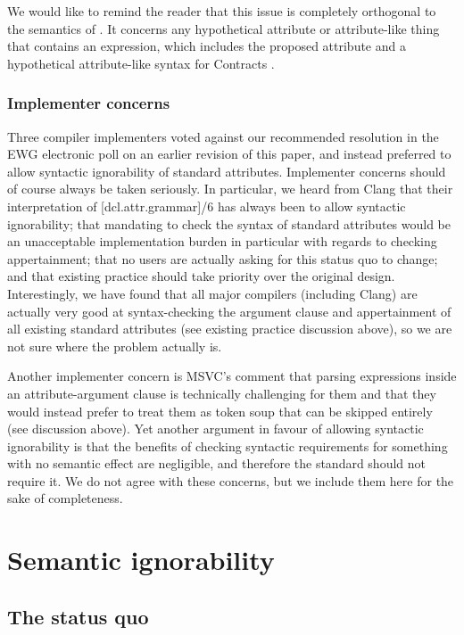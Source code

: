 We would like to remind the reader that this issue is completely orthogonal to the semantics of . It concerns any hypothetical attribute or attribute-like thing that contains an expression, which includes the proposed  attribute \cite{P1144R5} and a hypothetical attribute-like syntax for Contracts \cite{P2487R0}.

\subsubsection{Implementer concerns}
 
Three compiler implementers voted against our recommended resolution in the EWG electronic poll on an earlier revision of this paper, and instead preferred to allow syntactic ignorability of standard attributes. Implementer concerns should of course always be taken seriously. In particular, we heard from Clang that their interpretation of [dcl.attr.grammar]/6 has always been to allow syntactic ignorability; that mandating to check the syntax of standard attributes would be an unacceptable implementation burden in particular with regards to checking appertainment;  that no users are actually asking for this status quo to change; and that existing practice should take priority over the original design. Interestingly, we have found that all major compilers (including Clang) are actually very good at syntax-checking the argument clause and appertainment of all existing standard attributes (see existing practice discussion above), so we are not sure where the problem actually is.

Another implementer concern is MSVC's comment that parsing expressions inside an attribute-argument clause is technically challenging for them and that they would instead prefer to treat them as token soup that can be skipped entirely (see discussion above). Yet another argument in favour of allowing syntactic ignorability is that the benefits of checking syntactic requirements for something with no semantic effect are negligible, and therefore the standard should not require it. We do not agree with these concerns, but we include them here for the sake of completeness.

\section{Semantic ignorability}
\label{sec:semantic}

\subsection{The status quo}

